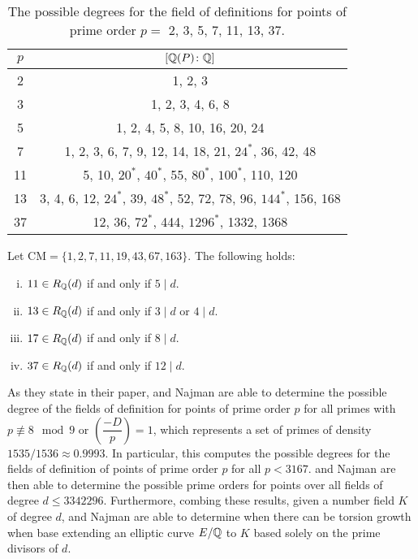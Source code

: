 	\begin{table}[!ht]
	\centering
	\caption{The possible degrees for the field of definitions for points of prime order $p=$ 2, 3, 5, 7, 11, 13, 37.\label{tab:degreetab}}
	\begin{tabular}{|c|c|} \hline
	$p$ & $[\mathbb{Q}(P) \colon \mathbb{Q}]$ \\ \hline
	2 & 1, 2, 3 \\ \hline
	3 & 1, 2, 3, 4, 6, 8 \\ \hline
	5 & 1, 2, 4, 5, 8, 10, 16, 20, 24 \\ \hline
	7 & 1, 2, 3, 6, 7, 9, 12, 14, 18, 21, $24^*$, 36, 42, 48 \\ \hline
	11 & 5, 10, $20^*$, $40^*$, 55, $80^*$, $100^*$, 110, 120 \\ \hline
	13 & 3, 4, 6, 12, $24^*$, 39, $48^*$, 52, 72, 78, 96, $144^*$, 156, 168 \\ \hline
	37 & 12, 36, $72^*$, 444, $1296^*$, 1332, 1368 \\ \hline
	\end{tabular}
	\end{table}


\begin{cor}
Let $\text{CM}= \{ 1, 2, 7, 11, 19, 43, 67, 163 \}$. The following holds:
	\begin{enumerate}[(i)]
	\item $11 \in R_{\mathbb{Q}}(d)$ if and only if $5 \mid d$.
	\item $13 \in R_{\mathbb{Q}}(d)$ if and only if $3 \mid d$ or $4 \mid d$.
	\item $17 \in R_{\mathbb{Q}}(d)$ if and only if $8 \mid d$.
	\item $37 \in R_{\mathbb{Q}}(d)$ if and only if $12 \mid d$. 
	\end{enumerate}
\end{cor}


As they state in their paper, \gonjim{} and Najman are able to determine the possible degree of the fields of definition for points of prime order $p$ for all primes with $p \not\equiv 8 \mod 9$ or $\genfrac(){}{0}{-D}{p}= 1$, which represents a set of primes of density $1535/1536 \approx 0.9993$. In particular, this computes the possible degrees for the fields of definition of points of prime order $p$ for all $p < 3167$. \gonjim{} and Najman are then able to determine the possible prime orders for points over all fields of degree $d \leq 3342296$. Furthermore, combing these results, given a number field $K$ of degree $d$, \gonjim{} and Najman are able to determine when there can be torsion growth when base extending an elliptic curve $E/\mathbb{Q}$ to $K$ based solely on the prime divisors of $d$. 


